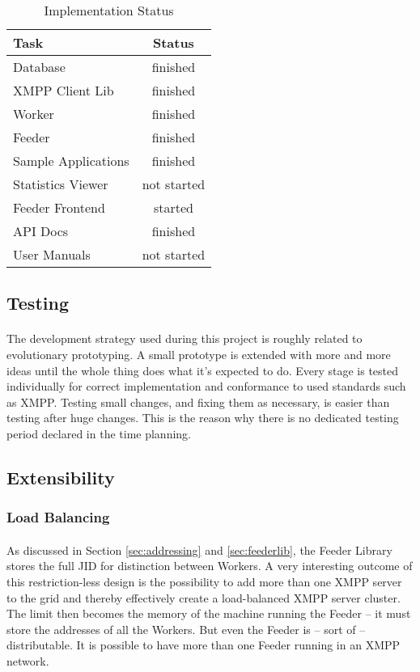 \begin{table}[H]
\begin{tabularx}{\linewidth}{lc}
\toprule
\textbf{Task} & \textbf{Status} \\
\midrule
\endhead
Database            & finished \\
XMPP Client Lib     & finished \\
Worker              & finished \\
Feeder              & finished \\
Sample Applications & finished \\
Statistics Viewer   & not started  \\
Feeder Frontend     & started  \\
API Docs            & finished \\
User Manuals        & not started  \\
\bottomrule
\end{tabularx}
\caption{Implementation Status}
\label{tab:impstatus}
\end{table}


\subsection{Testing}
\label{sec:testing}
\paragraph{}
The development strategy used during this project is roughly related to evolutionary prototyping. A small prototype is extended with more and more ideas until the whole thing does what it's expected to do. Every stage is tested individually for correct implementation and conformance to used standards such as XMPP. Testing small changes, and fixing them as necessary, is easier than testing after huge changes. This is the reason why there is no dedicated testing period declared in the time planning.


\subsection{Extensibility}
\label{sec:extensibility}

\subsubsection{Load Balancing}
\paragraph{}
As discussed in Section \ref{sec:addressing} and \ref{sec:feederlib}, the Feeder Library stores the full JID for distinction between Workers. A very interesting outcome of this restriction-less design is the possibility to add more than one XMPP server to the grid and thereby effectively create a load-balanced XMPP server cluster. The limit then becomes the memory of the machine running the Feeder -- it must store the addresses of all the Workers. But even the Feeder is -- sort of -- distributable. It is possible to have more than one Feeder running in an XMPP network.

